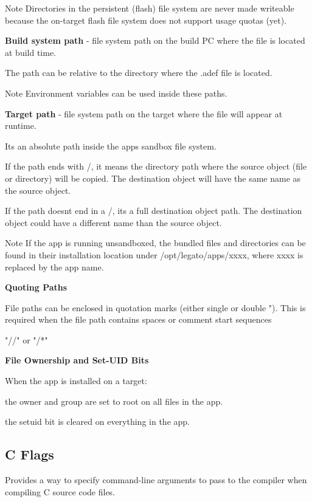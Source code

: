 \begin{DoxyNote}{Note}
Directories in the persistent (flash) file system are never made writeable because the on-\/target flash file system does not support usage quotas (yet).
\end{DoxyNote}
{\bfseries Build system path} -\/ file system path on the build P\+C where the file is located at build time.

The path can be relative to the directory where the {\ttfamily }.adef file is located.

\begin{DoxyNote}{Note}
Environment variables can be used inside these paths.
\end{DoxyNote}
{\bfseries Target path} -\/ file system path on the target where the file will appear at runtime.

It\textquotesingle{}s an absolute path inside the app\textquotesingle{}s sandbox file system.

If the path ends with \textquotesingle{}/\textquotesingle{}, it means the directory path where the source object (file or directory) will be copied. The destination object will have the same name as the source object.

If the path doesn\textquotesingle{}t end in a \textquotesingle{}/\textquotesingle{}, it\textquotesingle{}s a full destination object path. The destination object could have a different name than the source object.

\begin{DoxyNote}{Note}
If the app is running unsandboxed, the bundled files and directories can be found in their installation location under {\ttfamily /opt/legato/apps/xxxx}, where xxxx is replaced by the app name.
\end{DoxyNote}
{\bfseries Quoting Paths}

File paths can be enclosed in quotation marks (either single \textquotesingle{} or double "). This is required when the file path contains spaces or comment start sequences \begin{DoxyVerb}"//" or  "/*"
\end{DoxyVerb}


{\bfseries File Ownership and Set-\/\+U\+I\+D Bits}

When the app is installed on a target\+: ~\newline

\begin{DoxyItemize}
\item the owner and group are set to {\ttfamily root} on all files in the app.
\item the {\ttfamily setuid} bit is cleared on everything in the app.
\end{DoxyItemize}\hypertarget{def_files_cdef_defFilesCdef_cFlags}{}\subsection{C Flags}\label{def_files_cdef_defFilesCdef_cFlags}
Provides a way to specify command-\/line arguments to pass to the compiler when compiling C source code files.

